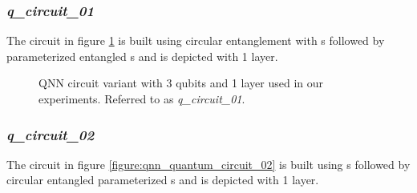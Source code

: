 \clearpage

\subsubsection{\textit{q\_circuit\_01}}
\label{subsubsection:qnn_quantum_circuit_01}
The circuit in figure \ref{figure:qnn_quantum_circuit_01} is built using circular entanglement with \rygate s followed by parameterized entangled \crygate s and is depicted with 1 layer. 

\begin{figure}[!h]
	\centering
	\caption{QNN circuit variant with 3 qubits and 1 layer used in our experiments. Referred to as \textit{q\_circuit\_01}.}
	\label{figure:qnn_quantum_circuit_01}
\end{figure}

\subsubsection{\textit{q\_circuit\_02}}
\label{subsubsection:qnn_quantum_circuit_02}
The circuit in figure \ref{figure:qnn_quantum_circuit_02} is built using \rygate s followed by circular entangled parameterized \crygate s and is depicted with 1 layer.

